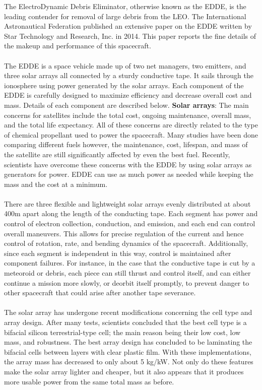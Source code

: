 \documentclass{article}
\theoremstyle{plain}			%
\theoremstyle{definition}		%
\theoremstyle{remark}
\numberwithin{equation}{section}
\numberwithin{figure}{section}
\numberwithin{table}{section}
\begin{document}
The ElectroDynamic Debris Eliminator, otherwise known as the EDDE, is the leading contender for removal of large debris from the LEO. The International Astronautical Federation published an extensive paper on the EDDE written by Star Technology and Research, Inc. in 2014. This paper reports the fine details of the makeup and performance of this spacecraft.\\
\\
The EDDE is a space vehicle made up of two net managers, two emitters, and three solar arrays all connected by a sturdy conductive tape. It sails through the ionosphere using power generated by the solar arrays.  Each component of the EDDE is carefully designed to maximize efficiency and decrease overall cost and mass.  Details of each component are described below.
\textbf{Solar arrays}: The main concerns for satellites include the total cost, ongoing maintenance, overall mass, and the total life expectancy.  All of these concerns are directly related to the type of chemical propellant used to power the spacecraft. Many studies have been done comparing different fuels however, the maintenance, cost, lifespan, and mass of the satellite are still significantly affected by even the best fuel. Recently, scientists have overcome these concerns with the EDDE by using solar arrays as generators for power.  EDDE can use as much power as needed while keeping the mass and the cost at a minimum.\\
\\
There are three flexible and lightweight solar arrays evenly distributed at about 400m apart along the length of the conducting tape. Each segment has power and control of electron collection, conduction, and emission, and each end can control overall maneuvers.  This allows for precise regulation of the current and hence control of rotation, rate, and bending dynamics of the spacecraft.  Additionally, since each segment is independent in this way, control is maintained after component failures. For instance, in the case that the conductive tape is cut by a meteoroid or debris, each piece can still thrust and control itself, and can either continue a mission more slowly, or deorbit itself promptly, to prevent danger to other spacecraft that could arise after another tape severance.\\
\\
The solar array has undergone recent modifications concerning the cell type and array design. After many tests, scientists concluded that the best cell type is a bifacial silicon terrestrial-type cell; the main reason being their low cost, low mass, and robustness. The best array design has concluded to be laminating the bifacial cells between layers with clear plastic film.  With these implementations, the array mass has decreased to only about 5 kg/kW. Not only do these features make the solar array lighter and cheaper, but it also appears that it produces more usable power from the same total mass as before.\\
\end{document}
